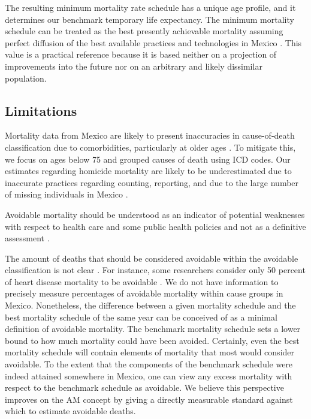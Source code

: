 \documentclass{bmcart}
\begin{document}
The resulting minimum mortality rate schedule has a unique age profile, and it determines our benchmark temporary life expectancy. The minimum mortality schedule can be treated as the best presently achievable mortality assuming perfect diffusion of the best available practices and technologies in Mexico \cite{vallin2008minimum}. This value is a practical reference because it is based neither on a projection of improvements into the future nor on an arbitrary and likely dissimilar population. 


\subsection*{Limitations}
Mortality data from Mexico are
likely to present inaccuracies in cause-of-death classification due to
comorbidities, particularly at older ages \cite{tobias2001}. To mitigate this,
we focus on ages below 75 and grouped causes of death using ICD codes.
Our estimates regarding homicide mortality are likely to be
underestimated due to inaccurate practices regarding counting, reporting,
and due to the large number of missing individuals in Mexico \cite{HRW2011}.

Avoidable mortality should be understood as an indicator of potential
weaknesses with respect to health care and some public health policies and not
as a definitive assessment \cite{nolte&mckee2008}.

The amount of deaths that should be considered avoidable within the avoidable classification is not clear \cite{beltran2011avoidable}. For instance, some researchers consider only 50 percent of heart disease mortality to be avoidable \cite{nolte2012amenable, holland2003}. We do not have information to precisely
measure percentages of avoidable mortality within cause groups in Mexico. Nonetheless, the
difference between a given mortality schedule and the best mortality schedule of
the same year can be conceived of as a minimal definition of avoidable
mortality. The benchmark mortality schedule sets a lower bound to how much mortality could have been avoided. Certainly, even the best mortality schedule will contain elements of mortality that
most would consider avoidable. To the extent that the components of the benchmark schedule were indeed
attained somewhere in Mexico, one can view any excess mortality
with respect to the benchmark schedule as avoidable. We believe this perspective improves on the AM concept by giving a directly measurable standard against which to estimate avoidable deaths.
\end{document}
